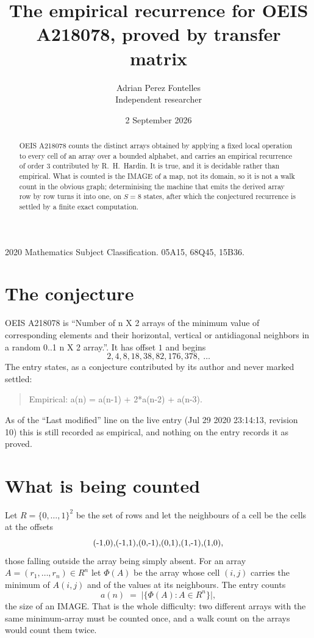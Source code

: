 \documentclass[11pt,a4paper]{article}
\title{The empirical recurrence for OEIS A218078, proved by transfer matrix}
\author{Adrian Perez Fontelles\\ \small Independent researcher}
\date{2 September 2026}
\theoremstyle{plain}
\theoremstyle{definition}
\begin{document}
\maketitle

\begin{abstract}
OEIS A218078 counts the distinct arrays obtained by applying a fixed local operation to every cell
of an array over a bounded alphabet, and carries an empirical recurrence of order $3$
contributed by R.~H.~Hardin. It is true, and it is decidable rather than empirical. What is
counted is the IMAGE of a map, not its domain, so it is not a walk count in the obvious graph;
determinising the machine that emits the derived array row by row turns it into one, on
$S=8$ states, after which the conjectured recurrence is settled by a finite exact
computation.
\end{abstract}

\noindent\small 2020 Mathematics Subject Classification. 05A15, 68Q45, 15B36.\normalsize

\section{The conjecture}

OEIS A218078 is ``Number of n X 2 arrays of the minimum value of corresponding elements and their horizontal, vertical or antidiagonal neighbors in a random 0..1 n X 2 array.''. It has offset $1$ and begins
\[
2, 4, 8, 18, 38, 82, 176, 378,\ \dots
\]
The entry states, as a conjecture contributed by its author and never marked settled:
\begin{quote}
Empirical: a(n) = a(n-1) + 2*a(n-2) + a(n-3).
\end{quote}
As of the ``Last modified'' line on the live entry (Jul 29 2020 23:14:13, revision 10) this is still
recorded as empirical, and nothing on the entry records it as proved.

\section{What is being counted}

Let $R=\{0,\dots,1\}^{2}$ be the set of rows and let the neighbours of
a cell be the cells at the offsets
\[
$(-1,0)$, $(-1,1)$, $(0,-1)$, $(0,1)$, $(1,-1)$, $(1,0)$,
\]
those falling outside the array being simply absent. For an array
$A=(r_1,\dots,r_n)\in R^n$ let $\Phi(A)$ be the array whose cell $(i,j)$ carries the
minimum of $A(i,j)$ and of the values at its neighbours. The entry counts
\[
a(n)\;=\;\bigl|\{\Phi(A):A\in R^n\}\bigr| ,
\]
the size of an IMAGE. That is the whole difficulty: two different arrays with the same
minimum-array must be counted once, and a walk count on the arrays would count them twice.
\end{document}
